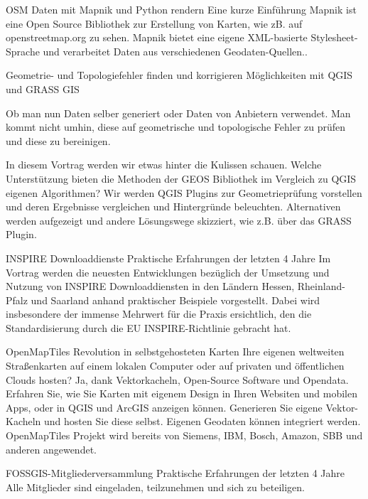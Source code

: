 %
{OSM Daten mit Mapnik und Python rendern}%
{Eine kurze Einführung }%
{%
Mapnik ist eine Open Source Bibliothek zur Erstellung von Karten, wie zB. auf openstreetmap.org zu sehen. Mapnik bietet eine eigene XML-basierte Stylesheet-Sprache und verarbeitet Daten aus verschiedenen Geodaten-Quellen..%
}

%
{Geometrie- und Topologiefehler finden und korrigieren}%
{Möglichkeiten mit QGIS und GRASS GIS}%
{%
Ob man nun Daten selber generiert oder Daten von Anbietern verwendet. Man kommt nicht umhin, diese auf geometrische und topologische Fehler zu prüfen und diese zu bereinigen. 

In diesem Vortrag werden wir etwas hinter die Kulissen schauen. Welche Unterstützung bieten die Methoden der GEOS Bibliothek im Vergleich zu QGIS eigenen Algorithmen? Wir werden QGIS Plugins zur Geometrieprüfung vorstellen und deren Ergebnisse vergleichen und Hintergründe beleuchten. Alternativen werden aufgezeigt und andere Lösungswege skizziert, wie z.B. über das GRASS Plugin.%
}

%
{INSPIRE Downloaddienste}%
{Praktische Erfahrungen der letzten 4 Jahre}%
{%
Im Vortrag werden die neuesten Entwicklungen bezüglich der Umsetzung und Nutzung von INSPIRE Downloaddiensten in den Ländern Hessen, Rheinland-Pfalz und Saarland anhand praktischer Beispiele vorgestellt. Dabei wird insbesondere der immense Mehrwert für die Praxis ersichtlich, den die Standardisierung durch die EU INSPIRE-Richtlinie gebracht hat.%
}

%
{OpenMapTiles}%
{Revolution in selbstgehosteten Karten}%
{%
Ihre eigenen weltweiten Straßenkarten auf einem lokalen Computer oder auf privaten und öffentlichen Clouds hosten? Ja, dank Vektorkacheln, Open-Source Software und Opendata. Erfahren Sie, wie Sie Karten mit eigenem Design in Ihren Websiten und mobilen Apps, oder in QGIS und ArcGIS anzeigen können. Generieren Sie eigene Vektor-Kacheln und hosten Sie diese selbst. Eigenen Geodaten können integriert werden. OpenMapTiles Projekt wird bereits von Siemens, IBM, Bosch, Amazon, SBB und anderen angewendet.%
}

\abstractZwei{}%
{FOSSGIS-Mitgliederversammlung}%
{Praktische Erfahrungen der letzten 4 Jahre}%
{%
Alle Mitglieder sind eingeladen, teilzunehmen und sich zu beteiligen.%
}
